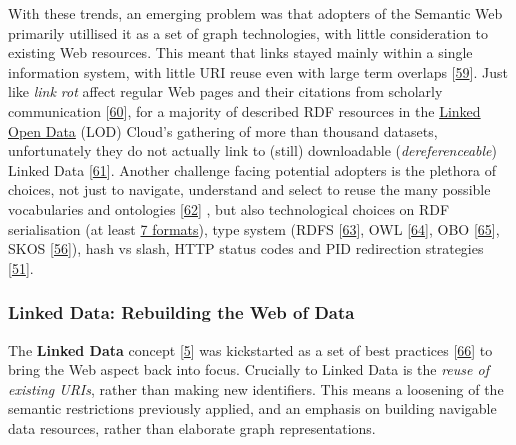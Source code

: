 With these trends, an emerging problem was that adopters of the Semantic Web primarily utillised it as a set of graph technologies, with little consideration to existing Web resources. This meant that links stayed mainly within a single information system, with little URI reuse even with large term overlaps {[}\protect\hyperlink{ref-9CdJnsoJ}{59}{]}. Just like \emph{link rot} affect regular Web pages and their citations from scholarly communication {[}\protect\hyperlink{ref-AGHR9oyr}{60}{]}, for a majority of described RDF resources in the \href{https://lod-cloud.net/}{Linked Open Data} (LOD) Cloud's gathering of more than thousand datasets, unfortunately they do not actually link to (still) downloadable (\emph{dereferenceable}) Linked Data {[}\protect\hyperlink{ref-5SuwLNdE}{61}{]}. Another challenge facing potential adopters is the plethora of choices, not just to navigate, understand and select to reuse the many possible vocabularies and ontologies {[}\protect\hyperlink{ref-TUmA4KQT}{62}{]} , but also technological choices on RDF serialisation (at least \href{https://www.w3.org/TR/rdf11-primer/\#section-graph-syntax}{7 formats}), type system (RDFS {[}\protect\hyperlink{ref-ZwAcGQKY}{63}{]}, OWL {[}\protect\hyperlink{ref-1p4IWJpI}{64}{]}, OBO {[}\protect\hyperlink{ref-1DalZuKct}{65}{]}, SKOS {[}\protect\hyperlink{ref-15gQDya5B}{56}{]}), hash vs slash, HTTP status codes and PID redirection strategies {[}\protect\hyperlink{ref-rnzJ4khD}{51}{]}.

\hypertarget{sec:ld-web}{%
\subsubsection{Linked Data: Rebuilding the Web of Data}\label{sec:ld-web}}

The \textbf{Linked Data} concept {[}\protect\hyperlink{ref-19s3yyxDn}{5}{]} was kickstarted as a set of best practices {[}\protect\hyperlink{ref-OGXYtGZ8}{66}{]} to bring the Web aspect back into focus. Crucially to Linked Data is the \emph{reuse of existing URIs}, rather than making new identifiers. This means a loosening of the semantic restrictions previously applied, and an emphasis on building navigable data resources, rather than elaborate graph representations.

